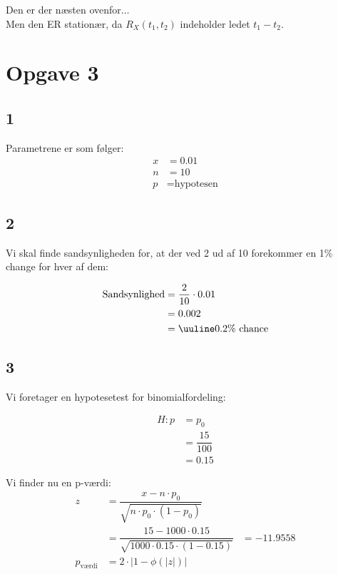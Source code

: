 \documentclass{article}
\begin{document}
Den er der næsten ovenfor$\dots$ \\
Men den ER stationær, da $R_X(t_1, t_2)$ indeholder ledet $t_1 - t_2$.




\newpage
\section*{Opgave 3} %

\subsection*{1} %
Parametrene er som følger:\\
\begin{align}
x &= 0.01\\
n &= 10 \\
p &= \text{hypotesen}
\end{align}


\subsection*{2} %

Vi skal finde sandsynligheden for, at der ved 2 ud af 10 forekommer en 1\% change for hver af dem:

\begin{align}
\text{Sandsynlighed} &= \dfrac{2}{10} \cdot 0.01 \\
	&= 0.002 \\
	&= \uuline{0.2\% \text{ chance}}
\end{align}

\subsection*{3} %

Vi foretager en hypotesetest for binomialfordeling: 

\begin{align}
H: p &= p_0 \\
	&= \dfrac{15}{100} \\
	&= 0.15
\end{align}

Vi finder nu en p-værdi:
\begin{align}
z &= \dfrac{x - n \cdot p_0}{\sqrt{n \cdot p_0 \cdot(1-p_0)}}\\
	&= \dfrac{15 - 1000 \cdot 0.15}{\sqrt{1000 \cdot 0.15 \cdot(1-0.15)}}
	&= -11.9558 \\
p_\text{værdi} &= 2 \cdot \left| 1- \phi(\left|z\right|) \right|
\end{align}
\end{document}
